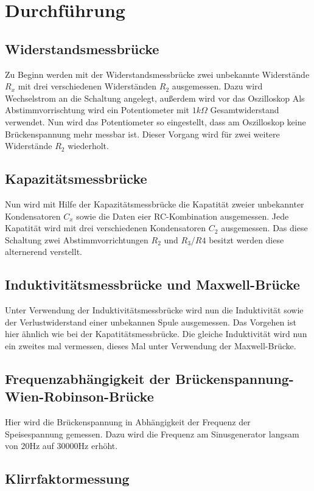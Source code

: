 \section{Durchführung}
\subsection{Widerstandsmessbrücke}
Zu Beginn werden mit der Widerstandsmessbrücke zwei unbekannte Widerstände $R_{x}$ mit
drei verschiedenen Widerständen $R_{2}$ ausgemessen.
Dazu wird Wechselstrom an die Schaltung angelegt, außerdem wird vor das Oszilloskop
Als Abstimmvorrischtung wird ein Potentiometer mit $1k\Omega$ Gesamtwiderstand
verwendet. Nun wird das Potentiometer so eingestellt, dass am Oszilloskop
keine Brückenspannung mehr messbar ist. Dieser Vorgang wird für zwei weitere
Widerstände $R_{2}$ wiederholt.

\subsection{Kapazitätsmessbrücke}
Nun wird mit Hilfe der Kapazitätsmessbrücke die Kapatität zweier unbekannter
Kondensatoren $C_{x}$ sowie die Daten eier RC-Kombination ausgemessen. Jede Kapatität
wird mit drei verschiedenen Kondensatoren $C_{2}$ ausgemessen.
Das diese Schaltung zwei Abstimmvorrichtungen $R_{2}$ und $R_{3}/R{4}$ besitzt werden diese
alternerend verstellt.

\subsection{Induktivitätsmessbrücke und Maxwell-Brücke}
Unter Verwendung der Induktivitätsmessbrücke wird nun die Induktivität sowie
der Verlustwiderstand einer unbekannen Spule ausgemessen. Das Vorgehen ist hier
ähnlich wie bei der Kapatitätsmessbrücke.
Die gleiche Induktivität wird nun ein zweites mal vermessen, dieses Mal unter
Verwendung der Maxwell-Brücke.

\subsection{Frequenzabhängigkeit der Brückenspannung-Wien-Robinson-Brücke}
Hier wird die Brückenspannung in Abhängigkeit der Frequenz der Speisespannung gemessen.
Dazu wird die Frequenz am Sinusgenerator langsam von 20Hz auf 30\:000Hz erhöht.

\subsection{Klirrfaktormessung}





\label{sec:Durchführung}
